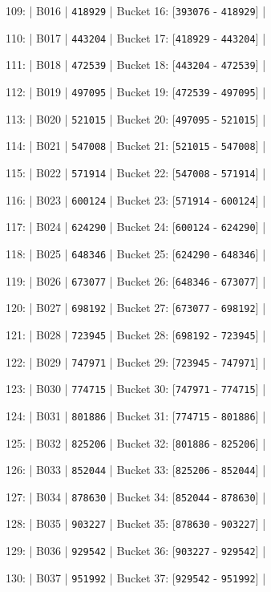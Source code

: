 \documentclass[11pt,a4paper]{article}
\begin{document}
{109: | B016 | \texttt{418929} | Bucket 16: [\texttt{393076} - \texttt{418929}] |

110: | B017 | \texttt{443204} | Bucket 17: [\texttt{418929} - \texttt{443204}] |

111: | B018 | \texttt{472539} | Bucket 18: [\texttt{443204} - \texttt{472539}] |

112: | B019 | \texttt{497095} | Bucket 19: [\texttt{472539} - \texttt{497095}] |

113: | B020 | \texttt{521015} | Bucket 20: [\texttt{497095} - \texttt{521015}] |

114: | B021 | \texttt{547008} | Bucket 21: [\texttt{521015} - \texttt{547008}] |

115: | B022 | \texttt{571914} | Bucket 22: [\texttt{547008} - \texttt{571914}] |

116: | B023 | \texttt{600124} | Bucket 23: [\texttt{571914} - \texttt{600124}] |

117: | B024 | \texttt{624290} | Bucket 24: [\texttt{600124} - \texttt{624290}] |

118: | B025 | \texttt{648346} | Bucket 25: [\texttt{624290} - \texttt{648346}] |

119: | B026 | \texttt{673077} | Bucket 26: [\texttt{648346} - \texttt{673077}] |

120: | B027 | \texttt{698192} | Bucket 27: [\texttt{673077} - \texttt{698192}] |

121: | B028 | \texttt{723945} | Bucket 28: [\texttt{698192} - \texttt{723945}] |

122: | B029 | \texttt{747971} | Bucket 29: [\texttt{723945} - \texttt{747971}] |

123: | B030 | \texttt{774715} | Bucket 30: [\texttt{747971} - \texttt{774715}] |

124: | B031 | \texttt{801886} | Bucket 31: [\texttt{774715} - \texttt{801886}] |

125: | B032 | \texttt{825206} | Bucket 32: [\texttt{801886} - \texttt{825206}] |

126: | B033 | \texttt{852044} | Bucket 33: [\texttt{825206} - \texttt{852044}] |

127: | B034 | \texttt{878630} | Bucket 34: [\texttt{852044} - \texttt{878630}] |

128: | B035 | \texttt{903227} | Bucket 35: [\texttt{878630} - \texttt{903227}] |

129: | B036 | \texttt{929542} | Bucket 36: [\texttt{903227} - \texttt{929542}] |

130: | B037 | \texttt{951992} | Bucket 37: [\texttt{929542} - \texttt{951992}] |

}
\end{document}
